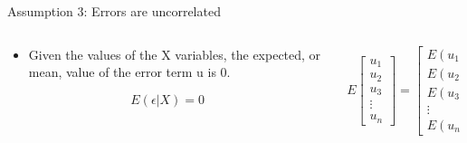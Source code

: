 \documentclass[australian,ignorenonframetext,aspectratio=169]{beamer}
\providecommand{\tightlist}{%
  \setlength{\itemsep}{0pt}\setlength{\parskip}{0pt}}
\begin{document}
\begin{frame}{Assumption 3: Errors are uncorrelated}
\protect\hypertarget{assumption-3-errors-are-uncorrelated}{}

\begin{columns}[T]
\begin{column}{0.5\textwidth}
\begin{itemize}
\tightlist
\item
  Given the values of the X variables, the expected, or mean, value of
  the error term u is 0.
\end{itemize}

\[E(\epsilon | X) = 0\]
\end{column}

\begin{column}{0.5\textwidth}
\[E\left[\begin{array}{l}
u_1 \\
u_2 \\
u_3 \\
\vdots \\
u_n
\end{array}\right]=\left[\begin{array}{l}
E\left(u_1\right) \\
E\left(u_2\right) \\
E\left(u_3\right) \\
\vdots \\
E\left(u_n\right)
\end{array}\right]=\left[\begin{array}{l}
0 \\
0 \\
0 \\
\vdots \\
0
\end{array}\right]\]
\end{column}
\end{columns}

\end{frame}
\end{document}
